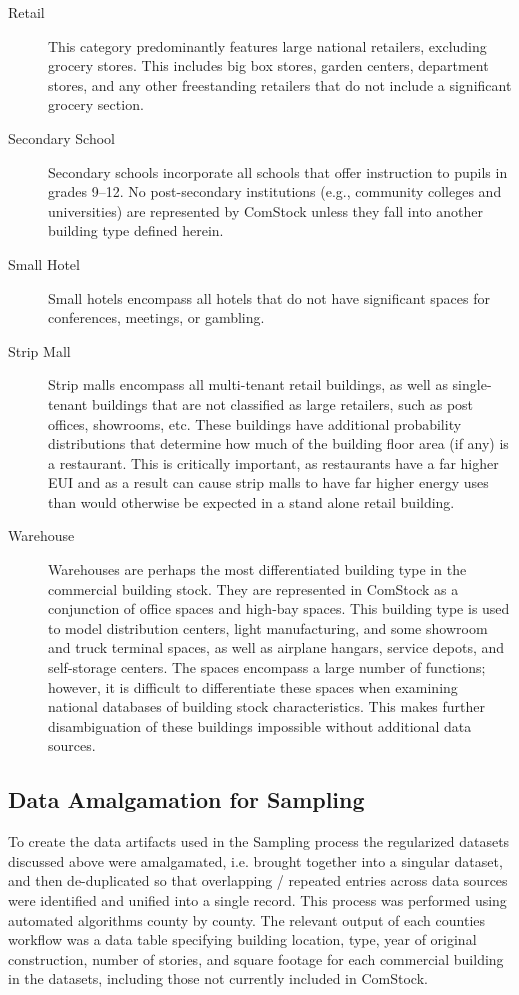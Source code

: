 \begin{description}
\item[Retail] This category predominantly features large national retailers, excluding grocery stores. This includes big box stores, garden centers, department stores, and any other freestanding retailers that do not include a significant grocery section.
\item[Secondary School] Secondary schools incorporate all schools that offer instruction to pupils in grades 9--12. No post-secondary institutions (e.g., community colleges and universities) are represented by ComStock unless they fall into another building type defined herein.
\item[Small Hotel] Small hotels encompass all hotels that do not have significant spaces for conferences, meetings, or gambling.
\item[Strip Mall] Strip malls encompass all multi-tenant retail buildings, as well as single-tenant buildings that are not classified as large retailers, such as post offices, showrooms, etc. These buildings have additional probability distributions that determine how much of the building floor area (if any) is a restaurant. This is critically important, as restaurants have a far higher EUI and as a result can cause strip malls to have far higher energy uses than would otherwise be expected in a stand alone retail building.
\item[Warehouse] Warehouses are perhaps the most differentiated building type in the commercial building stock. They are represented in ComStock as a conjunction of office spaces and high-bay spaces. This building type is used to model distribution centers, light manufacturing, and some showroom and truck terminal spaces, as well as airplane hangars, service depots, and self-storage centers. The spaces encompass a large number of functions; however, it is difficult to differentiate these spaces when examining national databases of building stock characteristics. This makes further disambiguation of these buildings impossible without additional data sources.
\end{description}

\subsection{Data Amalgamation for Sampling} \label{sec:3.1.3data amalgamation for sampling}

To create the data artifacts used in the Sampling process the regularized datasets discussed above were amalgamated, i.e. brought together into a singular dataset, and then de-duplicated so that overlapping / repeated entries across data sources were identified and unified into a single record. This process was performed using automated algorithms county by county. The relevant output of each counties workflow was a data table specifying building location, type, year of original construction, number of stories, and square footage for each commercial building in the datasets, including those not currently included in ComStock.

